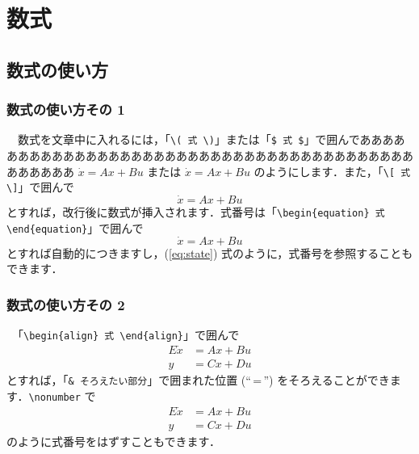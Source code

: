 
\section{数式}
\subsection{数式の使い方}
\subsubsection{数式の使い方その 1}
　数式を文章中に入れるには，「{\verb+\( 式 \)+}」または「{\verb+$ 式 $+}」で囲んでああああああああああああああああああああああああああああああああああああああああああああああ
\(
	\dot{x} = {A}{x} + {B}{u}
\) または $
	\dot{x} = Ax + Bu
$ のようにします．また，「{\verb+\[ 式 \]+}」で囲んで
\[
	\dot{x} = Ax + Bu
\]
とすれば，改行後に数式が挿入されます．式番号は「{\verb+\begin{equation} 式 \end{equation}+}」で囲んで
\begin{equation}
	\dot{x} = Ax + Bu
\label{eq:state}
\end{equation}
とすれば自動的につきますし，(\ref{eq:state}) 式のように，式番号を参照することもできます．

\subsubsection{数式の使い方その 2}
　「{\verb+\begin{align} 式 \end{align}+}」で囲んで
\begin{align}
	E\dot{x} &= Ax + Bu \\
	y &= Cx + Du
\end{align}
とすれば，「{\verb+& そろえたい部分+}」で囲まれた位置 (``\,=\,'') をそろえることができます．{\verb+\nonumber+} で
\begin{align}
	E\dot{x} &= Ax + Bu \\
	y &= Cx + Du \nonumber
\end{align}
のように式番号をはずすこともできます．

